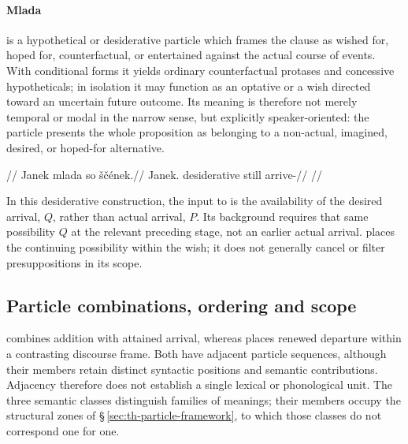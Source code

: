 \pex
{}
\xe

\paragraph{Mlada}  is a hypothetical or desiderative particle
which frames the
clause as wished for, hoped for, counterfactual, or entertained against the
actual course of events. With conditional forms it yields ordinary
counterfactual protases and concessive hypotheticals; in isolation it may
function as an optative  or a wish directed toward an uncertain
future outcome. Its meaning is therefore not merely temporal or modal in the
narrow sense, but explicitly speaker-oriented: the particle presents the whole
proposition as belonging to a non-actual, imagined, desired, or hoped-for
alternative.

\pex
\begingl
\glpreamble {}//
\gla Janek mlada so ščének.//
\glb Janek.\Dir{} desiderative still arrive-\Pf{}//
\glft {}//
\endgl
\xe

In this desiderative construction, the input to  is the availability
of the desired arrival, $Q$, rather than actual arrival, $P$. Its background
requires that same possibility $Q$ at the relevant preceding stage, not an
earlier actual arrival.  places the continuing possibility within
the wish; it does not generally cancel or filter presuppositions in its scope.

\subsection{Particle combinations, ordering and scope}
\label{sec:particle-combinations}

 combines addition with attained arrival, whereas
 places renewed departure within a contrasting
discourse frame. Both have adjacent particle sequences, although their
members retain distinct syntactic positions and semantic contributions.
Adjacency therefore does not establish a single lexical or phonological unit.
The three semantic classes distinguish families of meanings; their members
occupy the structural zones of §\,\ref{sec:th-particle-framework}, to which
those classes do not correspond one for one.

